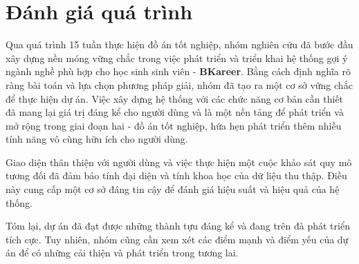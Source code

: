 \section{Đánh giá quá trình}
Qua quá trình 15 tuần thực hiện đồ án tốt nghiệp, nhóm nghiên cứu đã bước đầu xây dựng nền móng vững chắc trong việc phát triển và triển khai hệ thống gợi ý ngành nghề phù hợp cho học sinh sinh viên - \textbf{BKareer}. Bằng cách định nghĩa rõ ràng bài toán và lựa chọn phương pháp giải, nhóm đã tạo ra một cơ sở vững chắc để thực hiện dự án. Việc xây dựng hệ thống với các chức năng cơ bản cần thiết đã mang lại giá trị đáng kể cho người dùng và là một nền tảng để phát triển và mở rộng trong giai đoạn hai - đồ án tốt nghiệp, hứa hẹn phát triển thêm nhiều tính năng vô cùng hữu ích cho người dùng.

Giao diện thân thiện với người dùng và việc thực hiện một cuộc khảo sát quy mô tương đối đã đảm bảo tính đại diện và tính khoa học của dữ liệu thu thập. Điều này cung cấp một cơ sở đáng tin cậy để đánh giá hiệu suất và hiệu quả của hệ thống.

Tóm lại, dự án đã đạt được những thành tựu đáng kể và đang trên đà phát triển tích cực. Tuy nhiên, nhóm cũng cần xem xét các điểm mạnh và điểm yếu của dự án để có những cải thiện và phát triển trong tương lai.